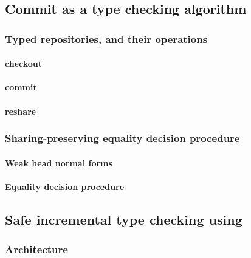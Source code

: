 \documentclass[preprint,9pt,authoryear]{sigplanconf}
\begin{document}
\subsection{Commit as a type checking algorithm}


\subsubsection{Typed repositories, and their operations}

\paragraph{checkout}

\paragraph{commit}


\paragraph{reshare}

\subsubsection{Sharing-preserving equality decision procedure}

\paragraph{Weak head normal forms}


\paragraph{Equality decision procedure}


\subsection{Safe incremental type checking using {\system}}

\subsubsection{Architecture}
\end{document}
